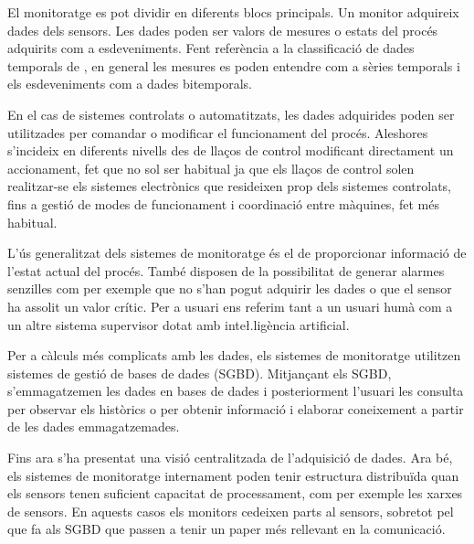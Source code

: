 El monitoratge es pot dividir en diferents blocs principals.
Un monitor adquireix dades dels sensors. Les dades poden ser valors de
mesures o estats del procés adquirits com a esdeveniments. Fent
referència a la classificació de dades temporals de
\textcite{assfalg08:thesis}, en general les mesures es poden entendre
com a sèries temporals i els esdeveniments com a dades bitemporals.

En el cas de sistemes controlats o automatitzats, les dades adquirides
poden ser utilitzades per comandar o modificar el funcionament del
procés. Aleshores s'incideix en diferents nivells des de llaços de
control modificant directament un accionament, fet que no sol ser
habitual ja que els llaços de control solen realitzar-se els sistemes
electrònics que resideixen prop dels sistemes controlats, fins a
gestió de modes de funcionament i coordinació entre màquines, fet més
habitual.

L'ús generalitzat dels sistemes de monitoratge és el de proporcionar
informació de l'estat actual del procés. També disposen de la
possibilitat de generar alarmes senzilles com per exemple que no s'han
pogut adquirir les dades o que el sensor ha assolit un valor
crític. Per a usuari ens referim tant a un usuari humà com a un altre
sistema supervisor dotat amb inte\l.ligència artificial.

Per a càlculs més complicats amb les dades, els sistemes de
monitoratge utilitzen sistemes de gestió de bases de dades
(SGBD). Mitjançant els SGBD, s'emmagatzemen les dades en bases de
dades i posteriorment l'usuari les consulta per observar els històrics
o per obtenir informació i elaborar coneixement a partir de les dades
emmagatzemades.

Fins ara s'ha presentat una visió centralitzada de l'adquisició de
dades. Ara bé, els sistemes de monitoratge internament poden tenir
estructura distribuïda quan els sensors tenen suficient capacitat de
processament, com per exemple les xarxes de sensors. En aquests casos
els monitors cedeixen parts al sensors, sobretot pel que fa als SGBD
que passen a tenir un paper més rellevant en la comunicació.


